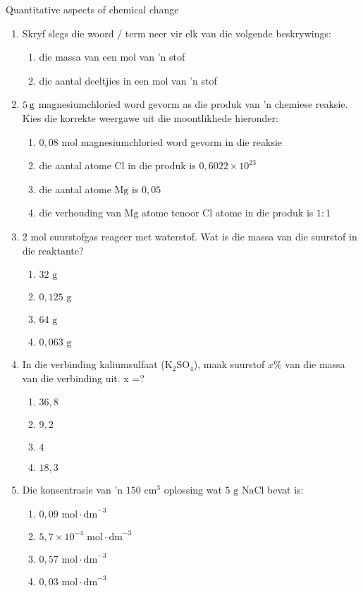             \begin{eocexercises}{Quantitative aspects of chemical change}
            \nopagebreak \noindent
\begin{enumerate}[noitemsep, label=\textbf{\arabic*}. ] 
\item Skryf slegs die woord / term neer vir elk van die volgende beskrywings:
 \begin{enumerate}[noitemsep, label=\textbf{\alph*}. ] 
 \item die massa van een mol van 'n stof
 \item die aantal deeltjies in een mol van 'n stof
\end{enumerate}
 \item $5\phantom{\rule{2pt}{0ex}}\text{g}$ magnesiumchloried word gevorm as die produk van 'n chemiese reaksie.  Kies die korrekte weergawe uit die moontlikhede hieronder:
  \begin{enumerate}[noitemsep, label=\textbf{\alph*}. ] 
  \item $0,08$ mol magnesiumchloried word gevorm in die reaksie
  \item die aantal atome $\text{Cl}$ in die produk is $0,6022\ensuremath{\times}{10}^{23}$
  \item die aantal atome $\text{Mg}$ is $0,05$
  \item die verhouding van $\text{Mg}$ atome tenoor $\text{Cl}$ atome in die produk is $1:1$
  \end{enumerate}
 \item 2 mol suurstofgas reageer met waterstof. Wat is die massa van die suurstof in die reaktante?
  \begin{enumerate}[noitemsep, label=\textbf{\alph*}. ]
  \item $32 \text{ g}$
  \item $0,125 \text{ g}$
  \item $64 \text{ g}$
  \item $0,063 \text{ g}$
  \end{enumerate}
 \item In die verbinding kaliumsulfaat ($\text{K}{}_{2}\text{SO}{}_{4}$), maak suurstof  $x\%$ van die massa van die verbinding uit. x =?
  \begin{enumerate}[noitemsep, label=\textbf{\alph*}. ]
  \item $36,8$
  \item $9,2$
  \item $4$
  \item $18,3$
  \end{enumerate}
 \item Die konsentrasie van 'n $150 {\text{ cm}}^{3}$ oplossing wat $5 \text{ g}$ $\text{NaCl}$ bevat is:
  \begin{enumerate}[noitemsep, label=\textbf{\alph*}. ]
  \item $0,09 \text{ mol} \cdot \text{dm}^{-3}$
  \item $5,7 \times 10^{-4} \text{ mol} \cdot \text{dm}^{-3}$
  \item $0,57 \text{ mol} \cdot \text{dm}^{-3}$
  \item $0,03 \text{ mol} \cdot \text{dm}^{-3}$
  \end{enumerate}


\end{enumerate}
\end{eocexercises}
